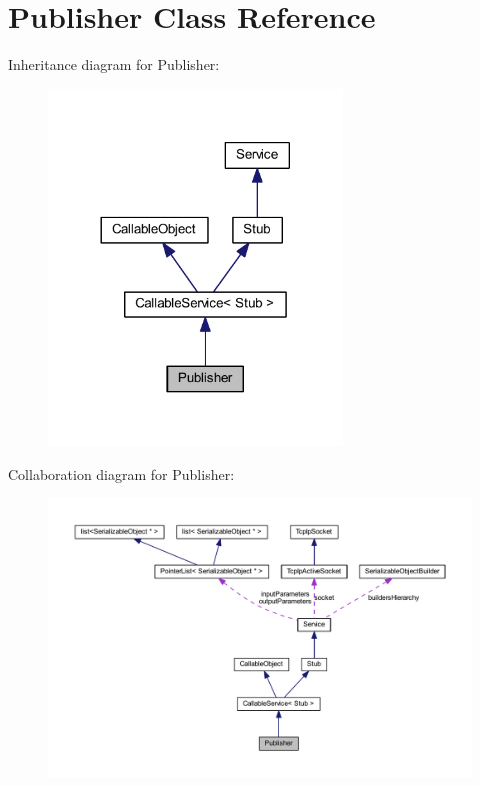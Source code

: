 \hypertarget{class_publisher}{
\section{Publisher Class Reference}
\label{class_publisher}
}


Inheritance diagram for Publisher:\nopagebreak
\begin{figure}[H]
\begin{center}
\leavevmode
\includegraphics[width=221pt]{class_publisher__inherit__graph}
\end{center}
\end{figure}


Collaboration diagram for Publisher:\nopagebreak
\begin{figure}[H]
\begin{center}
\leavevmode
\includegraphics[width=400pt]{class_publisher__coll__graph}
\end{center}
\end{figure}
